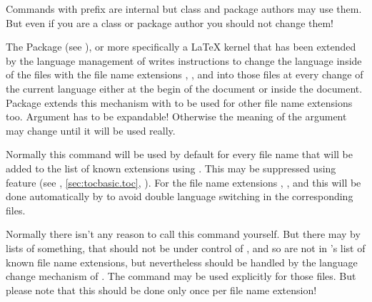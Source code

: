Commands with prefix  are internal but class and package
authors may use them. But even if you are a class or package author you
should not change them!

\begin{Declaration}
\end{Declaration}
%
The Package  (see \cite{package:babel}),
or more specifically a \LaTeX{} kernel that has been extended by the language
management of  writes instructions to change the language
inside of the files with the file name extensions , , and
 into those files at every change of the current language either at
the begin of the document or inside the document. Package 
extends this mechanism with  to be used for other
file name extensions too. Argument  has to be expandable!
Otherwise the meaning of the argument may change until it will be used really.

Normally this command will be used by default for every file name
 that will be added to the list of known extensions using
. This may be suppressed using feature
 (see ,
\autoref{sec:tocbasic.toc}, ). For the
file name extensions , , and  this will be done
automatically by  to avoid double language switching in the
corresponding files.

Normally there isn't any reason to call this command yourself. But there may
by lists of something, that should not be under control of ,
and so are not in 's list of known file name extensions, but
nevertheless should be handled by the language change mechanism of
. The command may be used explicitly for those files. But please
note that this should be done only once per file name extension!%
%

